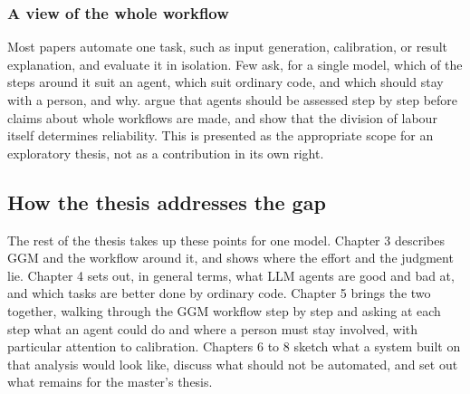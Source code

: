 \subsubsection{A view of the whole workflow}

Most papers automate one task, such as input generation, calibration, or result explanation, and evaluate it in isolation.
Few ask, for a single model, which of the steps around it suit an agent, which suit ordinary code, and which should stay with a person, and why.
\citet{chen2024scienceagentbench} argue that agents should be assessed step by step before claims about whole workflows are made, and \citet{zhu2026human} show that the division of labour itself determines reliability.
This is presented as the appropriate scope for an exploratory thesis, not as a contribution in its own right.

\subsection{How the thesis addresses the gap}

The rest of the thesis takes up these points for one model.
Chapter 3 describes GGM and the workflow around it, and shows where the effort and the judgment lie.
Chapter 4 sets out, in general terms, what LLM agents are good and bad at, and which tasks are better done by ordinary code.
Chapter 5 brings the two together, walking through the GGM workflow step by step and asking at each step what an agent could do and where a person must stay involved, with particular attention to calibration.
Chapters 6 to 8 sketch what a system built on that analysis would look like, discuss what should not be automated, and set out what remains for the master's thesis.
